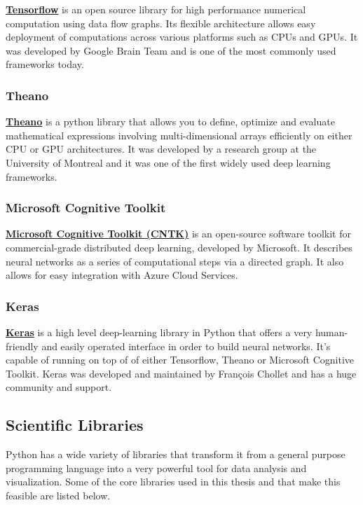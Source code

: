 \documentclass[a4paper, 12pt]{article}
\numberwithin{equation}{section}
\numberwithin{figure}{section}
\numberwithin{table}{section}
\begin{document}
	\href{https://www.tensorflow.org/}{\textbf{Tensorflow}} is an open source library  for high performance numerical computation using data flow graphs. Its flexible architecture allows easy deployment of computations across various platforms such as CPUs and GPUs. It was developed by Google Brain Team and is one of the most commonly used frameworks today.

	\subsubsection*{Theano}
	
	\href{http://deeplearning.net/software/theano/}{\textbf{Theano}} is a python library that allows you to define, optimize and evaluate mathematical expressions involving multi-dimensional arrays efficiently on either CPU or GPU architectures.
	It was developed by a research group at the University of Montreal and it was one of the first widely used deep learning frameworks.
	
	\subsubsection*{Microsoft Cognitive Toolkit}
	
	\href{https://www.microsoft.com/en-us/cognitive-toolkit/}{\textbf{Microsoft Cognitive Toolkit (CNTK)}} is an open-source software toolkit for commercial-grade distributed deep learning, developed by Microsoft. It describes neural networks as a series of computational steps via a directed graph. It also allows for easy integration with Azure Cloud Services.
	
	\subsubsection*{Keras}
	
	\href{https://keras.io/}{\textbf{Keras}} is a high level deep-learning library in Python that offers a very human-friendly and easily operated interface in order to build neural networks. It's capable of running on top of of either Tensorflow, Theano or Microsoft Cognitive Toolkit. Keras was developed and maintained by Fran\c{c}ois Chollet and has a huge community and support.
	
	\subsection{Scientific Libraries}
	
	Python has a wide variety of libraries that transform it from a general purpose programming language into a very powerful tool for data analysis and visualization. Some of the core libraries used in this thesis and that make this feasible are listed below.
	
\end{document}
